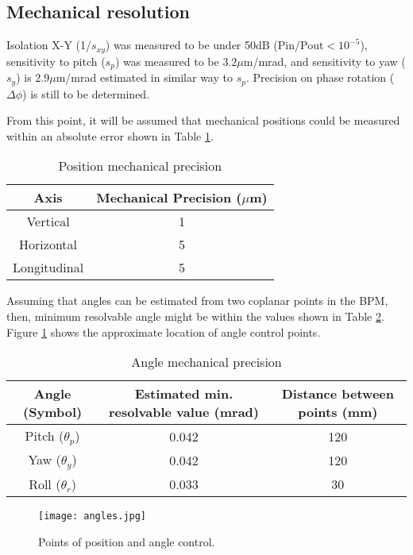 \subsection{Mechanical resolution}
Isolation X-Y (1/$s_{xy}$) was measured to be under 50dB (Pin/Pout$<10^{-5}$), sensitivity to pitch ($s_p$) was measured to be $3.2\mu$m/mrad, and sensitivity to yaw ($s_y$) is 2.9$\mu$m/mrad estimated in similar way to $s_p$. Precision on phase rotation ($\Delta\phi$) is still to be determined.\par

From this point, it will be assumed that mechanical positions could be measured within an absolute error shown in Table \ref{mechprec}.\par
\begin{table}[htb]
\begin{center}
 \begin{tabular}{|c|c|}\hline
  Axis & Mechanical Precision ($\mu$m)\\\hline
  Vertical & 1\\
  Horizontal & 5\\
  Longitudinal & 5 \\\hline
 \end{tabular}\caption{Position mechanical precision}\label{mechprec}
 \end{center}
\end{table}
Assuming that angles can be estimated from two coplanar points in the BPM, then, minimum resolvable angle might be within the values shown in Table \ref{angleprec}. Figure \ref{PAcontrol} shows the approximate location of angle control points.\par
\begin{table}[htb]
 \begin{center}
  \begin{tabular}{|c|c|c|}\hline
  Angle (Symbol) & Estimated min. resolvable value (mrad) & Distance between points (mm)\\\hline
   Pitch ($\theta_p$)&0.042&120\\
   Yaw ($\theta_y$)&0.042&120\\
   Roll ($\theta_r$)&0.033&30\\\hline
  \end{tabular}\caption{Angle mechanical precision}\label{angleprec}
 \end{center}
\end{table}
\begin{figure}[htb]
 \begin{center}
  \texttt{[image: angles.jpg]}\caption{Points of position and angle control.}\label{PAcontrol}
 \end{center}
\end{figure}
